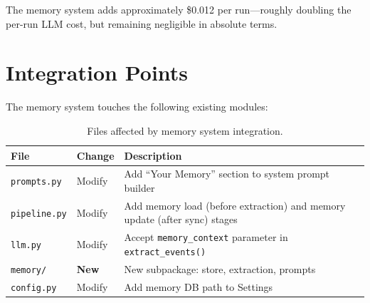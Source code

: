\documentclass[11pt, letterpaper]{article}
\begin{document}
\noindent The memory system adds approximately \$0.012 per run---roughly doubling
the per-run LLM cost, but remaining negligible in absolute terms.

\section{Integration Points}

The memory system touches the following existing modules:

\begin{table}[h]
\centering
\small
\begin{tabularx}{\textwidth}{llX}
\toprule
\textbf{File} & \textbf{Change} & \textbf{Description} \\
\midrule
\texttt{prompts.py} & Modify & Add ``Your Memory'' section to system prompt builder \\
\texttt{pipeline.py} & Modify & Add memory load (before extraction) and memory update (after sync) stages \\
\texttt{llm.py} & Modify & Accept \texttt{memory\_context} parameter in \texttt{extract\_events()} \\
\texttt{memory/} & \textbf{New} & New subpackage: store, extraction, prompts \\
\texttt{config.py} & Modify & Add memory DB path to Settings \\
\bottomrule
\end{tabularx}
\caption{Files affected by memory system integration.}
\end{table}
\end{document}
